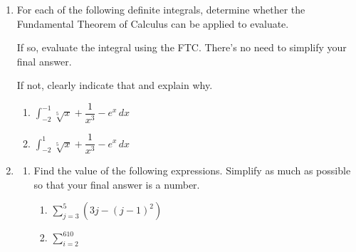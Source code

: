 \documentclass[11pt]{article}
\begin{document}
\begin{enumerate}

\newpage


\item For each of the following definite integrals, determine whether the Fundamental Theorem of Calculus can be applied to evaluate. 

If so, evaluate the integral using the FTC. There's no need to simplify your final answer.

If not, clearly indicate that and explain why.

\begin{enumerate}
    \item $\displaystyle\int_{-2}^{-1}\sqrt[5]{x}+\dfrac{1}{x^3}-e^x\, dx$

    \vfill

    \item $\displaystyle\int_{-2}^1\sqrt[5]{x}+\dfrac{1}{x^3}-e^x\, dx$

    \vfill
\end{enumerate}


\newpage


\item 

\begin{enumerate}
    \item Find the value of the following expressions. Simplify as much as possible so that your final answer is a number.

    \begin{enumerate}
        \item[(i)] $\displaystyle\sum_{j=3}^5(3j-(j-1)^2)$

        \vfill

        \item[(ii)] $\displaystyle\sum_{i=2}^610$


\end{enumerate}
\end{enumerate}
\end{enumerate}
\end{document}
